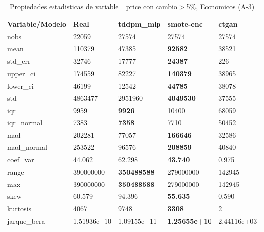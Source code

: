 \begin{table}[H]
\centering
\fontsize{8}{14}\selectfont
\caption{Propiedades estadisticas de variable \_price con cambio\ensuremath{>}5\%, Economicos (A-3)}
\label{table-stats-economicos-a-3-_price-short}
\begin{tabular}{|l|m{10em}|m{10em}|m{10em}|m{10em}|}
\hline
 \rowcolor[gray]{0.8}
Variable/Modelo & Real & tddpm\_mlp & smote-enc & ctgan \\
\hline nobs & 22059 & 27574 & 27574 & 27574 \\
\hline mean & 110379 & 47385 & \bfseries 92582 & \cellcolor[rgb]{0.9, 0.54, 0.52} 38521 \\
\hline std\_err & 32746 & 17777 & \bfseries 24387 & \cellcolor[rgb]{0.9, 0.54, 0.52} 226 \\
\hline upper\_ci & 174559 & 82227 & \bfseries 140379 & \cellcolor[rgb]{0.9, 0.54, 0.52} 38965 \\
\hline lower\_ci & 46199 & \cellcolor[rgb]{0.9, 0.54, 0.52} 12542 & \bfseries 44785 & 38078 \\
\hline std & 4863477 & 2951960 & \bfseries 4049530 & \cellcolor[rgb]{0.9, 0.54, 0.52} 37555 \\
\hline iqr & 9959 & \bfseries 9926 & 10400 & \cellcolor[rgb]{0.9, 0.54, 0.52} 68059 \\
\hline iqr\_normal & 7383 & \bfseries 7358 & 7710 & \cellcolor[rgb]{0.9, 0.54, 0.52} 50452 \\
\hline mad & 202281 & 77057 & \bfseries 166646 & \cellcolor[rgb]{0.9, 0.54, 0.52} 32586 \\
\hline mad\_normal & 253522 & 96576 & \bfseries 208859 & \cellcolor[rgb]{0.9, 0.54, 0.52} 40840 \\
\hline coef\_var & 44.062 & 62.298 & \bfseries 43.740 & \cellcolor[rgb]{0.9, 0.54, 0.52} 0.975 \\
\hline range & 390000000 & \bfseries 350488588 & 279000000 & \cellcolor[rgb]{0.9, 0.54, 0.52} 142945 \\
\hline max & 390000000 & \bfseries 350488588 & 279000000 & \cellcolor[rgb]{0.9, 0.54, 0.52} 142945 \\
\hline skew & 60.579 & 94.396 & \bfseries 55.635 & \cellcolor[rgb]{0.9, 0.54, 0.52} 0.590 \\
\hline kurtosis & 4067 & \cellcolor[rgb]{0.9, 0.54, 0.52} 9748 & \bfseries 3308 & 2 \\
\hline jarque\_bera & 1.51936e+10 & \cellcolor[rgb]{0.9, 0.54, 0.52} 1.09155e+11 & \bfseries 1.25655e+10 & 2.44116e+03 \\

\end{tabular}
\end{table}
